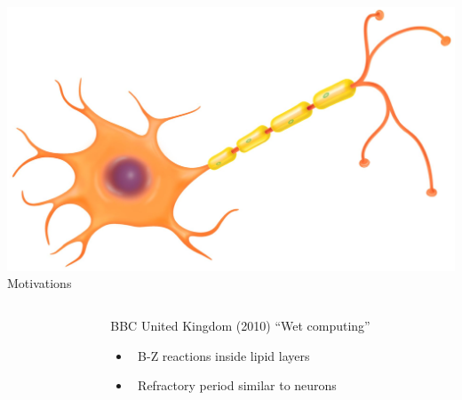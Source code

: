 \documentclass[serif,mathserif]{beamer}
\begin{document}
\begin{frame}{\includegraphics[height=0.06\textheight]{neuron.eps}\hspace{0.25cm} Motivations}
    \begin{columns}[t]
        \begin{column}{0.6\textwidth}
        \end{column}
        \begin{column}{0.4\textwidth}
            BBC United Kingdom (2010) ``Wet computing''
            \begin{itemize}
                \item \ \pause B-Z reactions inside lipid layers
                \item \ \pause Refractory period similar to neurons
            \end{itemize}
        \end{column}
    \end{columns}
\end{frame}
\end{document}
